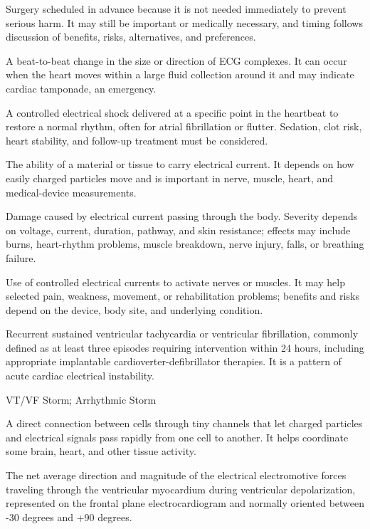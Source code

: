  Surgery scheduled in advance because it is not needed immediately to prevent serious harm. It may still be important or medically necessary, and timing follows discussion of benefits, risks, alternatives, and preferences.

 A beat-to-beat change in the size or direction of ECG complexes. It can occur when the heart moves within a large fluid collection around it and may indicate cardiac tamponade, an emergency.

 A controlled electrical shock delivered at a specific point in the heartbeat to restore a normal rhythm, often for atrial fibrillation or flutter. Sedation, clot risk, heart stability, and follow-up treatment must be considered.

 The ability of a material or tissue to carry electrical current. It depends on how easily charged particles move and is important in nerve, muscle, heart, and medical-device measurements.

 Damage caused by electrical current passing through the body. Severity depends on voltage, current, duration, pathway, and skin resistance; effects may include burns, heart-rhythm problems, muscle breakdown, nerve injury, falls, or breathing failure.

 Use of controlled electrical currents to activate nerves or muscles. It may help selected pain, weakness, movement, or rehabilitation problems; benefits and risks depend on the device, body site, and underlying condition.

 Recurrent sustained ventricular tachycardia or ventricular fibrillation, commonly defined as at least three episodes requiring intervention within 24 hours, including appropriate implantable cardioverter-defibrillator therapies. It is a pattern of acute cardiac electrical instability.

\synonyms
VT/VF Storm; Arrhythmic Storm

 A direct connection between cells through tiny channels that let charged particles and electrical signals pass rapidly from one cell to another. It helps coordinate some brain, heart, and other tissue activity.

 The net average direction and magnitude of the electrical electromotive forces traveling through the ventricular myocardium during ventricular depolarization, represented on the frontal plane electrocardiogram and normally oriented between -30 degrees and +90 degrees.

